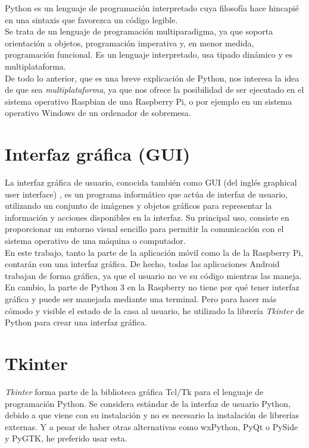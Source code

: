 Python \cite{wiki:python} es un lenguaje de programación interpretado cuya filosofía hace hincapié en una sintaxis que favorezca un código legible.\\
Se trata de un lenguaje de programación multiparadigma, ya que soporta orientación a objetos, programación imperativa y, en menor medida, programación funcional. Es un lenguaje interpretado, usa tipado dinámico y es multiplataforma.\\
De todo lo anterior, que es una breve explicación de Python, nos interesa la idea de que sea \textit{multiplataforma}, ya que nos ofrece la posibilidad de ser ejecutado en el sistema operativo Raspbian de una Raspberry Pi, o por ejemplo en un sistema operativo Windows de un ordenador de sobremesa.

\section{Interfaz gráfica (GUI)}

La interfaz gráfica de usuario, conocida también como GUI (del inglés graphical user interface) \cite{wiki:gui}, es un programa informático que actúa de interfaz de usuario, utilizando un conjunto de imágenes y objetos gráficos para representar la información y acciones disponibles en la interfaz. Su principal uso, consiste en proporcionar un entorno visual sencillo para permitir la comunicación con el sistema operativo de una máquina o computador. \\
En este trabajo, tanto la parte de la aplicación móvil como la de la Raspberry Pi, contarán con una interfaz gráfica. De hecho, todas las aplicaciones Android trabajan de forma gráfica, ya que el usuario no ve su código mientras las maneja. En cambio, la parte de Python 3 en la Raspberry no tiene por qué tener interfaz gráfica y puede ser manejada mediante una terminal. Pero para hacer más cómodo y visible el estado de la casa al usuario, he utilizado la librería \textit{Tkinter} de Python para crear una interfaz gráfica.

\section{Tkinter}

\textit{Tkinter} \cite{wiki:tk} forma parte de la biblioteca gráfica Tcl/Tk para el lenguaje de programación Python. Se considera estándar de la interfaz de usuario Python, debido a que viene con su instalación y no es necesario la instalación de librerías externas.
Y a pesar de haber otras alternativas como wxPython, PyQt o PySide y PyGTK, he preferido usar esta. 
